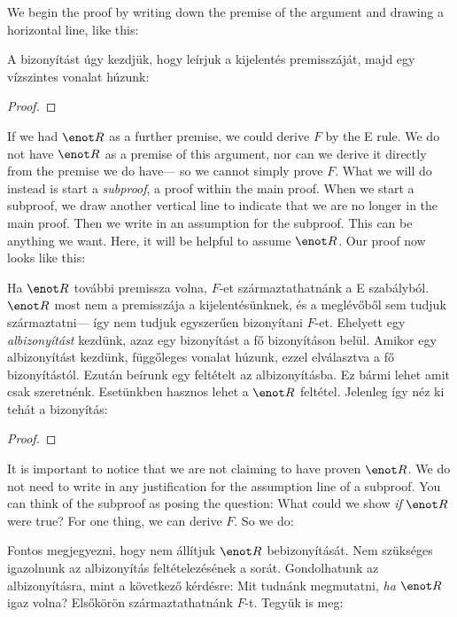 
We begin the proof by writing down the premise of the argument and drawing a horizontal line, like this:

A bizonyítást úgy kezdjük, hogy leírjuk a kijelentés premisszáját, majd egy vízszintes vonalat húzunk:

\begin{proof}
\end{proof}

If we had $\enot R$ as a further premise, we could derive $F$ by the {\eor}E rule. We do not have $\enot R$ as a premise of this argument, nor can we derive it directly from the premise we do have--- so we cannot simply prove $F$. What we will do instead is start a \emph{subproof}, a proof within the main proof. When we start a subproof, we draw another vertical line to indicate that we are no longer in the main proof. Then we write in an assumption for the subproof. This can be anything we want. Here, it will be helpful to assume $\enot R$. Our proof now looks like this:

Ha $\enot R$ további premissza volna, $F$-et származtathatnánk a {\eor}E szabályból. $\enot R$ most nem a premisszája a kijelentésünknek, és a meglévőből sem tudjuk származtatni--- így nem tudjuk egyszerűen bizonyítani $F$-et. Ehelyett egy \emph{albizonyítást} kezdünk, azaz egy bizonyítást a fő bizonyításon belül. Amikor egy albizonyítást kezdünk, függőleges vonalat húzunk, ezzel elválasztva a fő bizonyítástól. Ezután beírunk egy feltételt az albizonyításba. Ez bármi lehet amit csak szeretnénk. Esetünkben hasznos lehet a $\enot R$ feltétel. Jelenleg így néz ki tehát a bizonyítás:

\begin{proof}
	\open
	\close
\end{proof}

It is important to notice that we are not claiming to have proven $\enot R$. We do not need to write in any justification for the assumption line of a subproof. You can think of the subproof as posing the question: What could we show \emph{if} $\enot R$ were true? For one thing, we can derive $F$. So we do:

Fontos megjegyezni, hogy nem állítjuk $\enot R$ bebizonyítását. Nem szükséges igazolnunk az albizonyítás feltételezésének a sorát. Gondolhatunk az albizonyításra, mint a következő kérdésre: Mit tudnánk megmutatni, \emph{ha} $\enot R$ igaz volna? Elsőkörön származtathatnánk $F$-t. Tegyük is meg:

